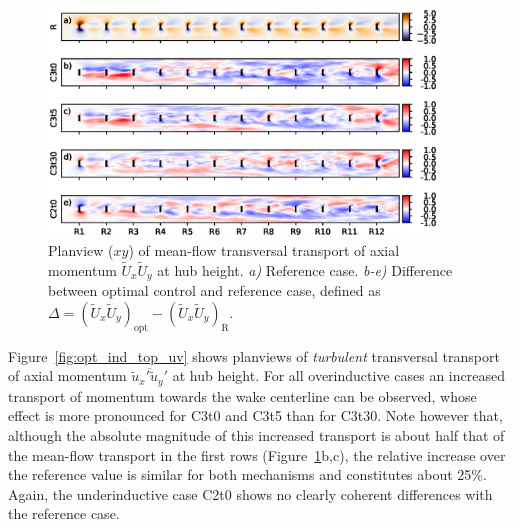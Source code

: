 		\begin{figure}[ht]
			\centering
			\includegraphics[width=0.92\textwidth]{chapters/optimal_induction_control/topview_uvm.eps}
			\caption{Planview ($xy$) of mean-flow transversal transport of axial momentum $\widetilde{U}_x \widetilde{U}_y$ at hub height. \emph{a) } Reference case. \emph{b-e)} Difference between optimal control and reference case, defined as $\Delta = (\widetilde{U}_x \widetilde{U}_y)_{\text{opt}} - (\widetilde{U}_x \widetilde{U}_y)_{\text{R}}$. \label{fig:opt_ind_top_uvm}}
		\end{figure}
	
		Figure~\ref{fig:opt_ind_top_uv} shows planviews of \emph{turbulent} transversal transport of axial momentum $\overline{\widetilde{u}_x' \widetilde{u}_y'}$ at hub height. For all overinductive cases an increased transport of momentum towards the wake centerline can be observed, whose effect is more pronounced for C3t0 and C3t5 than for C3t30. Note however that, although the absolute magnitude of this increased transport is about half that of the mean-flow transport in the first rows (Figure~\ref{fig:opt_ind_top_uvm}b,c), the relative increase over the reference value is similar for both mechanisms and constitutes about 25\%. Again, the underinductive case C2t0 shows no clearly coherent differences with the reference case. 
	
